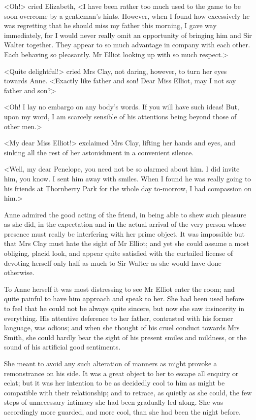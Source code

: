 <Oh!> cried Elizabeth, <I have been rather too much used to the game to be soon overcome by a gentleman's hints. However, when I found how excessively he was regretting that he should miss my father this morning, I gave way immediately, for I would never really omit an opportunity of bringing him and Sir Walter together. They appear to so much advantage in company with each other. Each behaving so pleasantly. Mr Elliot looking up with so much respect.>

<Quite delightful!> cried Mrs Clay, not daring, however, to turn her eyes towards Anne. <Exactly like father and son! Dear Miss Elliot, may I not say father and son?>

<Oh! I lay no embargo on any body's words. If you will have such ideas! But, upon my word, I am scarcely sensible of his attentions being beyond those of other men.>

<My dear Miss Elliot!> exclaimed Mrs Clay, lifting her hands and eyes, and sinking all the rest of her astonishment in a convenient silence.

<Well, my dear Penelope, you need not be so alarmed about him. I did invite him, you know. I sent him away with smiles. When I found he was really going to his friends at Thornberry Park for the whole day to-morrow, I had compassion on him.>

Anne admired the good acting of the friend, in being able to shew such pleasure as she did, in the expectation and in the actual arrival of the very person whose presence must really be interfering with her prime object. It was impossible but that Mrs Clay must hate the sight of Mr Elliot; and yet she could assume a most obliging, placid look, and appear quite satisfied with the curtailed license of devoting herself only half as much to Sir Walter as she would have done otherwise.

To Anne herself it was most distressing to see Mr Elliot enter the room; and quite painful to have him approach and speak to her. She had been used before to feel that he could not be always quite sincere, but now she saw insincerity in everything. His attentive deference to her father, contrasted with his former language, was odious; and when she thought of his cruel conduct towards Mrs Smith, she could hardly bear the sight of his present smiles and mildness, or the sound of his artificial good sentiments.

She meant to avoid any such alteration of manners as might provoke a remonstrance on his side. It was a great object to her to escape all enquiry or eclat; but it was her intention to be as decidedly cool to him as might be compatible with their relationship; and to retrace, as quietly as she could, the few steps of unnecessary intimacy she had been gradually led along. She was accordingly more guarded, and more cool, than she had been the night before.

